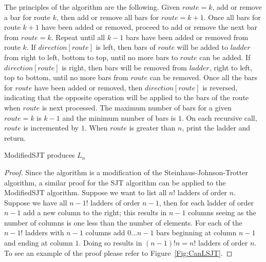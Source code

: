 \pagebreak


The principles of the algorithm are the following. Given $route=k$, add or remove a bar for route $k$, then add or remove 
all bars for $route=k+1$. Once all bars for route $k+1$ have been added or removed, 
proceed to add or remove the next bar from $route=k$. Repeat until all $k-1$ bars have been added or removed from route $k$.
If $direction[route]$ is left, then bars of $route$ will be added to 
$ladder$ from right to left, bottom to top, until no more bars to $route$ can be added.
If $direction[route]$ is right, then bars will be removed from $ladder$, right to left, top to bottom, until 
no more bars from $route$ can be removed. Once all the bars for $route$ have 
been added or removed, then $direction[route]$ is reversed,
indicating that the opposite operation will be applied to the bars of the route when 
$route$ is next processed. The maximum number of bars for a given $route=k$ is $k-1$ and the minimum number of 
bars is $1$. On each recursive call, $route$ is 
incremented by $1$. When $route$ is greater than $n$, print the ladder 
and return. 


\begin{lemma}
  {\sc ModifiedSJT} produces $L_{n}$
\end{lemma}
\begin{proof}
  Since the algorithm is a modification of the Steinhaus-Johnson-Trotter algorithm, a similar proof for the SJT algorithm 
can be applied to the {\sc ModifiedSJT} algorithm. Suppose we want to list all $n!$ ladders 
of order $n$. Suppose we have all $n-1!$ ladders of order $n-1$, then for 
each ladder of order $n-1$ add a new column to the right; this results in $n-1$ columns seeing as 
the number of columns is one less than the number of elements. For each of the $n-1!$ ladders with $n-1$ columns 
add $0 \dots n-1$ bars beginning at column $n-1$ and ending 
at column $1$. Doing so results in $(n-1)!n=n!$ ladders of order $n$. To see 
an example of the proof please refer to Figure~\ref{Fig:CanLSJT}.
\end{proof}


